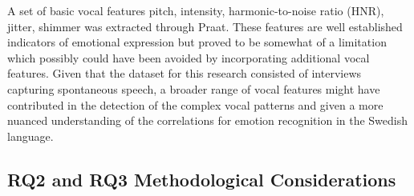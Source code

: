 A set of basic vocal features pitch, intensity, harmonic-to-noise ratio (HNR), jitter, shimmer was extracted through Praat. These features are well established indicators of emotional expression but proved to be somewhat of a limitation which possibly could have been avoided by incorporating additional vocal features. Given that the dataset for this research consisted of interviews capturing spontaneous speech, a broader range of vocal features might have contributed in the detection of the complex vocal patterns and given a more nuanced understanding of the correlations for emotion recognition in the Swedish language.

\subsection{RQ2 and RQ3 Methodological Considerations}